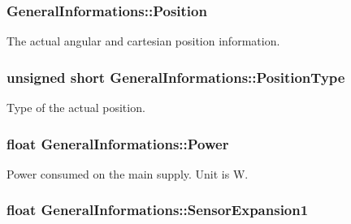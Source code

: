 \subsubsection[{\texorpdfstring{Position}{Position}}]{ General\+Informations\+::\+Position}\hypertarget{struct_general_informations_a1bdb970acfdca928cf01a6850dc3ff3a}{}\label{struct_general_informations_a1bdb970acfdca928cf01a6850dc3ff3a}


The actual angular and cartesian position information. 

\subsubsection[{\texorpdfstring{Position\+Type}{PositionType}}]{\setlength{\rightskip}{0pt plus 5cm}unsigned short General\+Informations\+::\+Position\+Type}\hypertarget{struct_general_informations_aaca0e478d0550e1c1763fcf8efe0c561}{}\label{struct_general_informations_aaca0e478d0550e1c1763fcf8efe0c561}


Type of the actual position. 

\subsubsection[{\texorpdfstring{Power}{Power}}]{\setlength{\rightskip}{0pt plus 5cm}float General\+Informations\+::\+Power}\hypertarget{struct_general_informations_aacfd4f60945e48471c09376abfbd3c46}{}\label{struct_general_informations_aacfd4f60945e48471c09376abfbd3c46}


Power consumed on the main supply. Unit is W. 

\subsubsection[{\texorpdfstring{Sensor\+Expansion1}{SensorExpansion1}}]{\setlength{\rightskip}{0pt plus 5cm}float General\+Informations\+::\+Sensor\+Expansion1}\hypertarget{struct_general_informations_add8723743dfc70752472ada7ba50779c}{}\label{struct_general_informations_add8723743dfc70752472ada7ba50779c}


